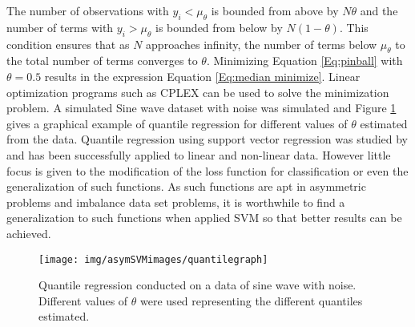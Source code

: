 \documentclass[twoside,11pt]{article}
\begin{document}
The number of observations with $y_i < \mu_{\theta}$ is bounded from above by $N\theta$ and the number of terms with $y_i > \mu_{\theta}$ is bounded from below by $N(1-\theta)$. This condition ensures that as $N$ approaches infinity, the number of terms below $\mu_{\theta}$ to the total number of terms converges to $\theta$. Minimizing Equation \ref{Eq:pinball} with $\theta=0.5$ results in the expression Equation \ref{Eq:median minimize}. Linear optimization programs such as CPLEX can be used to solve the minimization problem. A simulated Sine wave dataset with noise was simulated and Figure \ref{Fig:Quantile Regression} gives a graphical example of quantile regression for different values of $\theta$ estimated from the data. Quantile regression using support vector regression was studied by \citet{Changha05} and has been successfully applied to linear and non-linear data. However little focus is given to the modification of the loss function for classification or even the generalization of such functions. As such functions are apt in asymmetric problems and imbalance data set problems, it is worthwhile to find a generalization to such functions when applied SVM so that better results can be achieved. 

\begin{figure}
 \centering
\texttt{[image: img/asymSVMimages/quantilegraph]}\\
 \caption{Quantile regression conducted on a data of sine wave with noise. Different values of $\theta$ were used representing the different quantiles estimated.}
 \label{Fig:Quantile Regression}
\end{figure}
\end{document}
